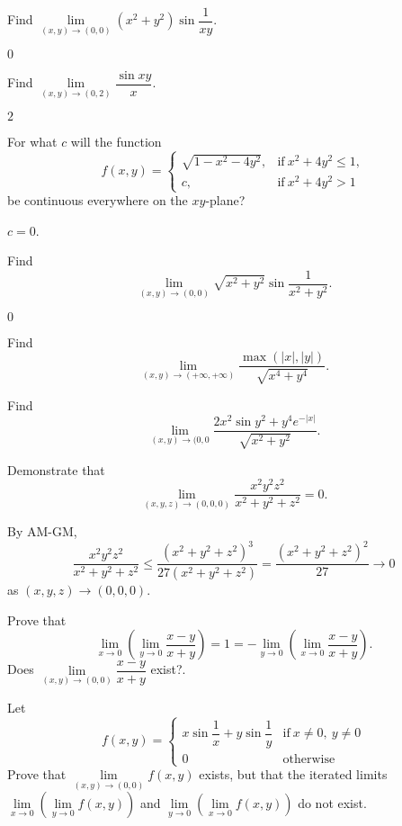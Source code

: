 \begin{multicols}{2}
\begin{problem}
Find $\lim\limits _{(x,y)\to (0,0)} (x^2+y^2)\sin \dfrac{1}{xy}$.
\begin{answer} $0$ \end{answer}
\end{problem}
\begin{problem}
Find $\lim\limits _{(x,y)\to (0,2)} \dfrac{\sin xy}{x}$.
\begin{answer} $2$ \end{answer}
\end{problem}
\begin{problem} For what $c$ will the function
$$ f(x,y)=\left\{\begin{array}{ll}\sqrt{1-x^2-4y^2}, & \mathrm{if}\ x^2+4y^2\leq 1, \\
c, & \mathrm{if}\ x^2+4y^2 >1\end{array}\right. $$ be continuous
everywhere on the $xy$-plane?
\begin{answer}
$c=0$.
\end{answer}
\end{problem}
\begin{problem}
Find $$\lim\limits _{(x,y)\to (0,0)} \sqrt{x^2+y^2}\sin
\dfrac{1}{x^2+y^2}.$$
\begin{answer} $0$ \end{answer}
\end{problem}
\begin{problem}
Find $$ \lim\limits _{(x,y)\to (+\infty,+\infty)} \dfrac{\max (|x|,
|y|)}{\sqrt{x^4+y^4}}.
$$
\end{problem}
\begin{problem}
Find $$ \lim\limits _{(x,y)\to (0,0} \dfrac{2x^2\sin y^2 +
y^4e^{-|x|}}{\sqrt{x^2+y^2}}.
$$
\end{problem}
\begin{problem}
Demonstrate that $$ \lim\limits _{(x,y,z)\to (0,0,0)}
\dfrac{x^2y^2z^2}{x^2+y^2+z^2}=0. $$
\begin{answer}
By AM-GM, $$\dfrac{x^2y^2z^2}{x^2+y^2+z^2} \leq
\dfrac{(x^2+y^2+z^2)^3}{27(x^2+y^2+z^2)} =
\dfrac{(x^2+y^2+z^2)^2}{27}\to 0$$ as $(x,y,z)\to (0,0,0)$.
\end{answer}
\end{problem}
\begin{problem}
Prove that $$\lim\limits _{x\to 0}\left(\lim\limits _{y\to 0}
\dfrac{x-y}{x+y}\right) = 1 =-\lim\limits _{y\to 0}\left(\lim\limits _{x\to 0}
\dfrac{x-y}{x+y}\right).
$$Does $\lim\limits _{(x,y)\to (0,0)} \dfrac{x-y}{x+y}$ exist?.
\end{problem}
\begin{problem}
Let $$ f(x,y)=\left\{\begin{array}{ll} x\sin \dfrac{1}{x}+y\sin
\dfrac{1}{y} & \mathrm{if}\ x\neq 0, \ y\neq 0 \\
0 & \mathrm{otherwise}\end{array}\right.
$$Prove that $\lim\limits _{(x,y)\to (0,0)} f(x,y)$ exists, but that the
iterated limits $\lim\limits _{x\to 0}\left(\lim\limits _{y\to 0} f(x,y)\right)$
and $\lim\limits _{y\to 0}\left(\lim\limits _{x\to 0} f(x,y)\right)$ do not exist.
\end{problem}



\end{multicols}
